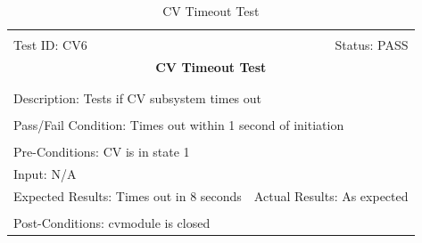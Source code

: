 \documentclass[11pt]{article}
\begin{document}
\begin{center}
\begin{table}[H]
\begin{tabular}{|l r|}\hline&\\[-2mm]
	Test ID: CV6	&Status: PASS\\[-3mm]
	\multicolumn{2}{|c|}{\textbf{\large{CV Timeout Test}}}\\&\\\hline&\\[-3mm]
	\multicolumn{2}{|p{\textwidth}|}{Description: Tests if CV subsystem times out}\\[1mm]\hline&\\[-3mm]
	\multicolumn{2}{|p{\textwidth}|}{Pass/Fail Condition: Times out within 1 second of initiation}\\[1mm]\hline&\\[-3mm]
	\multicolumn{2}{|p{\textwidth}|}{Pre-Conditions: CV is in state 1}\\[4mm]
	\multicolumn{2}{|p{\textwidth}|}{Input: N/A}\\[2mm]\hline
	\multicolumn{1}{|p{0.49\textwidth}}{Expected Results: Times out in 8 seconds}	&\multicolumn{1}{|p{0.45\textwidth}|}{Actual Results: As expected}\\\hline&\\[-3mm]
	\multicolumn{2}{|p{\textwidth}|}{Post-Conditions: cvmodule is closed}\\\hline
\end{tabular}
\caption{CV Timeout Test}
\end{table}
\end{center}
\end{document}
